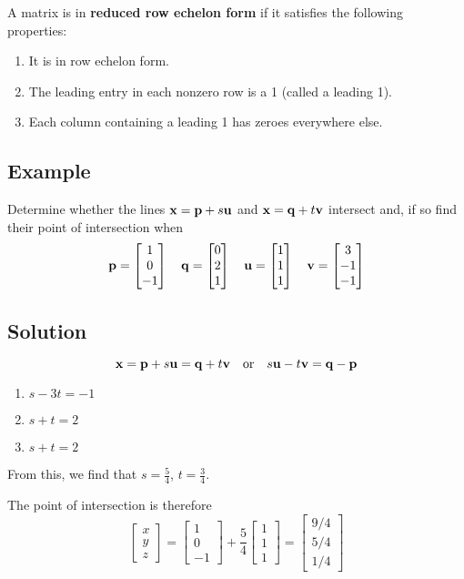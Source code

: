 A matrix is in \textbf{reduced row echelon form} if it satisfies the following properties:
\begin{enumerate}
    \item It is in row echelon form.
    \item The leading entry in each nonzero row is a 1 (called a leading 1).
    \item Each column containing a leading 1 has zeroes everywhere else.
\end{enumerate}

\subsection*{Example}
Determine whether the lines $\mathbf{x}=\mathbf{p}+s\mathbf{u}$ and $\mathbf{x}=\mathbf{q}+t\mathbf{v}$ intersect and,
if so find their point of intersection when
$$\mathbf{p}=\begin{bmatrix}
        1 \\ 0 \\ -1
    \end{bmatrix} \quad \mathbf{q}=\begin{bmatrix}
        0 \\ 2 \\ 1
    \end{bmatrix} \quad \mathbf{u}=\begin{bmatrix}
        1 \\1\\1
    \end{bmatrix} \quad \mathbf{v}=\begin{bmatrix}
        3 \\ -1 \\ -1
    \end{bmatrix}$$

\subsection*{Solution}
$$\mathbf{x}=\mathbf{p}+s\mathbf{u}=\mathbf{q}+t\mathbf{v} \quad\text{or}\quad s\mathbf{u}-t\mathbf{v}=\mathbf{q}-\mathbf{p}$$
\begin{enumerate}
    \item[] $s-3t=-1$
    \item[] $s+t=2$
    \item[] $s+t=2$
\end{enumerate}
From this, we find that $s=\frac{5}{4}$, $t=\frac{3}{4}$.

The point of intersection is therefore
$$\begin{bmatrix}
        x \\ y\\ z
    \end{bmatrix}=\begin{bmatrix}
        1 \\ 0 \\ -1
    \end{bmatrix}+\frac{5}{4}\begin{bmatrix}
        1 \\ 1\\ 1
    \end{bmatrix}=\begin{bmatrix}
        9/4 \\ 5/4 \\ 1/4
    \end{bmatrix}$$

